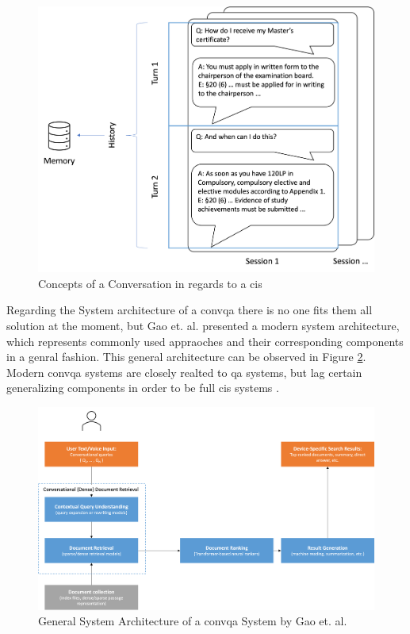 \begin{figure}
    \centering
    \includegraphics[width=\textwidth]{Grafiken/Conversation_Explain.png}
    \caption{Concepts of a Conversation in regards to a \gls{cis}}
    \label{fig:conversation_explain}
\end{figure}

Regarding the System architecture of a \gls{convqa} there is no one fits them all solution at the moment, but Gao et. al. \cite{gao_neural_2022} presented a modern system architecture, which represents commonly used appraoches and their corresponding components in a genral fashion. This general architecture can be observed in Figure \ref{fig:convqa_system_architecture}. Modern \gls{convqa} systems are closely realted to \gls{qa} systems, but lag certain generalizing components in order to be full \gls{cis} systems \cite{zamani_conversational_2023}.

\begin{figure}
    \centering
    \includegraphics[width=\textwidth]{Grafiken/System_Architecture_ConQA.png}
    \caption{General System Architecture of a \gls{convqa} System by Gao et. al. \cite{gao_neural_2022}}
    \label{fig:convqa_system_architecture}
\end{figure}

